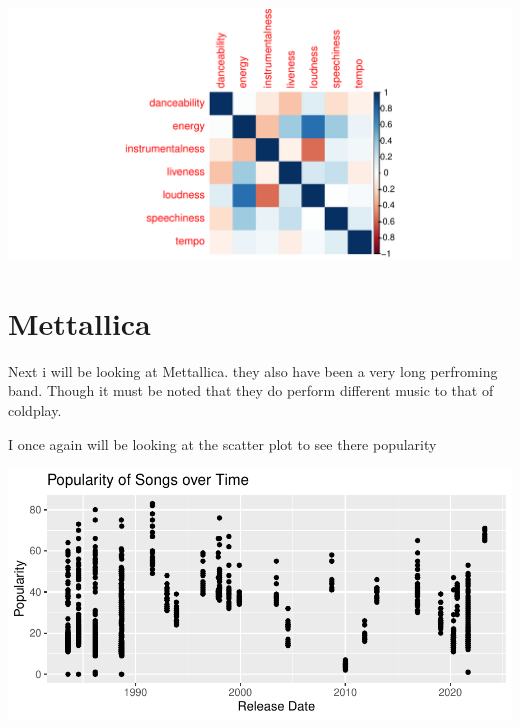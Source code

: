 \documentclass[12pt,preprint, authoryear]{elsarticle}
\let\origfigure\figure
\let\endorigfigure\endfigure
\renewenvironment{figure}[1][2] {
    \expandafter\origfigure\expandafter[H]
} {
    \endorigfigure
}
\numberwithin{equation}{section}
\numberwithin{figure}{section}
\numberwithin{table}{section}
\begin{document}
\begin{figure}[H]

{\centering \includegraphics{Q3_files/figure-latex/Figure3-1} 

}

\caption{Correlation matrix  \label{Figure1}}\label{fig:Figure3}
\end{figure}

\hypertarget{mettallica}{%
\section{Mettallica}\label{mettallica}}

Next i will be looking at Mettallica. they also have been a very long
perfroming band. Though it must be noted that they do perform different
music to that of coldplay.

I once again will be looking at the scatter plot to see there popularity

\begin{figure}[H]

{\centering \includegraphics{Q3_files/figure-latex/Figure4-1} 

}

\caption{Popularity of Songs \label{Figure1}}\label{fig:Figure4}
\end{figure}
\end{document}
